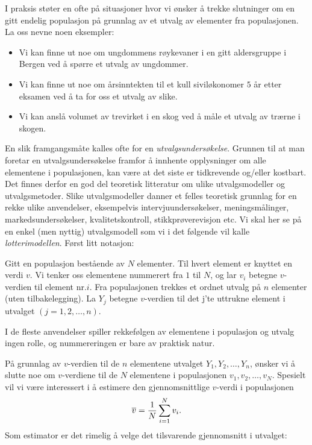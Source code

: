 I praksis støter en ofte på situasjoner hvor vi ønsker
å trekke slutninger om en gitt endelig populasjon på
grunnlag av et utvalg av elementer fra populasjonen. La oss nevne
noen eksempler:
\begin{itemize}
\item Vi kan finne ut noe om ungdommens røykevaner i en gitt
aldersgruppe i Bergen ved å spørre et utvalg av ungdommer.
\item Vi kan finne ut noe om årsinntekten til et kull
siviløkonomer $5$ år etter eksamen ved å ta for oss et
utvalg av slike.
\item Vi kan anslå volumet av trevirket i en skog ved å
måle et utvalg av trærne i skogen.
\end{itemize}

En slik framgangsmåte kalles ofte for en {\em
utvalgsundersøkelse}. Grunnen til at man foretar en
utvalgsundersøkelse framfor å innhente opplysninger om
alle elementene i populasjonen, kan være at det siste er
tidkrevende og/eller kostbart. Det finnes derfor en god del
teoretisk litteratur om ulike utvalgsmodeller og utvalgsmetoder.
Slike utvalgsmodeller danner et felles teoretisk grunnlag for en
rekke ulike anvendelser, eksempelvis intervjuundersøkelser,
meningsmålinger, markedsundersøkelser, kvalitetskontroll,
stikkprøverevisjon etc. Vi skal her se på en 
enkel (men nyttig) utvalgs\-modell som vi i det følgende vil
kalle {\em lotterimodellen}. Først litt notasjon:
   
Gitt en populasjon bestående av $N$ elementer. Til hvert element er
knyttet en verdi $v$. Vi tenker oss elementene nummerert fra $1$ til $N$,
og lar $v_i$ betegne $v$-verdien til element nr.$i$.
 Fra populasjonen trekkes et ordnet utvalg på $n$ elementer
(uten tilbakelegging). La $Y_j$ betegne $v$-verdien til det
j'te uttrukne element i utvalget $(j=1,2,\ldots ,n)$.

I de fleste anvendelser spiller rekkefølgen av elementene i
populasjon og utvalg ingen rolle, og nummereringen er bare av praktisk natur.

\begin{center}  \end{center}                               
På grunnlag av $v$-verdien til de $n$ elementene utvalget
$Y_1,Y_2,\ldots ,Y_n$, ønsker vi å slutte noe om $v$-verdiene
til de $N$ elementene i populasjonen $v_1,v_2,\ldots ,v_N$.
Spesielt vil vi være interessert i å estimere den
gjennom\-snittlige $v$-verdi i populasjonen
     \[{\bar v}={1\over N}\sum_{i=1}^N v_i.\]
Som estimator er det rimelig å velge det tilsvarende
gjennomsnitt i  utvalget:

